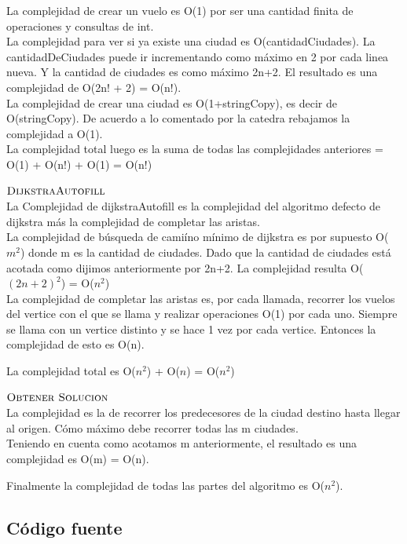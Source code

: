 \noindent
La complejidad de crear un vuelo es O(1) por ser una cantidad finita de operaciones y consultas de int.\\
La complejidad para ver si ya existe una ciudad es O(cantidadCiudades). La cantidadDeCiudades puede ir incrementando como m\'aximo en 2 por cada linea nueva. Y la cantidad de ciudades es como m\'aximo 2n+2.
El resultado es una complejidad de O(2n! + 2) = O(n!). \\
La complejidad de crear una ciudad es O(1+stringCopy), es decir de O(stringCopy). De acuerdo a lo comentado por la catedra rebajamos la complejidad a O(1).\\
La complejidad total luego es la suma de todas las complejidades anteriores = O(1) + O(n!) + O(1) = O(n!)
\bigskip

\noindent
$\textnormal{\scshape DijkstraAutofill}$ \\

\noindent
La Complejidad de dijkstraAutofill es la complejidad del algoritmo defecto de dijkstra m\'as la complejidad de completar las aristas. \\

\noindent
La complejidad de b\'usqueda de cami\'ino m\'inimo de dijkstra es por supuesto O($m^2$) donde m es la cantidad de ciudades. Dado que la cantidad de ciudades est\'a acotada como dijimos anteriormente por 2n+2. La complejidad resulta O($(2n+2)^2$) = O($n^2$) \\

\noindent
La complejidad de completar las aristas es, por cada llamada, recorrer los vuelos del vertice con el que se llama y realizar operaciones O(1) por cada uno. Siempre se llama con un vertice distinto y se hace 1 vez por cada vertice. Entonces la complejidad de esto es O(n).

\noindent
La complejidad total es O($n^2$) +  O($n$) =  O($n^2$)
\bigskip
\bigskip

\noindent
$\textnormal{\scshape Obtener Solucion}$ \\

\noindent
La complejidad es la de recorrer los predecesores de la ciudad destino hasta llegar al origen. C\'omo m\'aximo debe recorrer todas las m ciudades.  \\
Teniendo en cuenta como acotamos m anteriormente, el resultado es una complejidad es O(m) = O(n). 
\bigskip

\noindent
Finalmente la complejidad de todas las partes del algoritmo es O($n^2$). 



\subsection{C\'odigo fuente}

